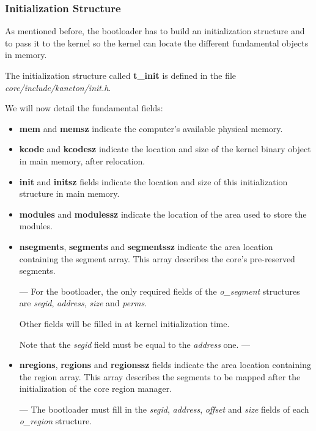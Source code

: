 \subsubsection{Initialization Structure}

As mentioned before, the bootloader has to build an initialization structure
and to pass it to the kernel so the kernel can locate the different
fundamental objects in memory.

The initialization structure called \textbf{t\_init} is defined in the
file \textit{core/include/kaneton/init.h}.

We will now detail the fundamental fields:

\begin{itemize}
  \item
    \textbf{mem} and \textbf{memsz} indicate the computer's available
    physical memory.
  \item
    \textbf{kcode} and \textbf{kcodesz} indicate the location and
    size of the kernel binary object in main memory, after relocation.
  \item
    \textbf{init} and \textbf{initsz} fields indicate the location and
    size of this initialization structure in main memory.
  \item
    \textbf{modules} and \textbf{modulessz} indicate the location of
    the area used to store the modules.
  \item
    \textbf{nsegments}, \textbf{segments} and \textbf{segmentssz}
    indicate the area location containing the segment array. This
    array describes the core's pre-reserved segments.

---
    For the bootloader, the only required fields of the \textit{o\_segment}
    structures are \textit{segid}, \textit{address}, \textit{size} and
    \textit{perms}.

    Other fields will be filled in at kernel initialization time.

    Note that the \textit{segid} field must be equal to the
    \textit{address} one.
---

  \item
    \textbf{nregions}, \textbf{regions} and \textbf{regionssz} fields
    indicate the area location containing the region array. This array
    describes the segments to be mapped after the initialization of the
    core region manager.

---
    The bootloader must fill in the \textit{segid}, \textit{address},
    \textit{offset} and \textit{size} fields of each \textit{o\_region}
    structure.


\end{itemize}
